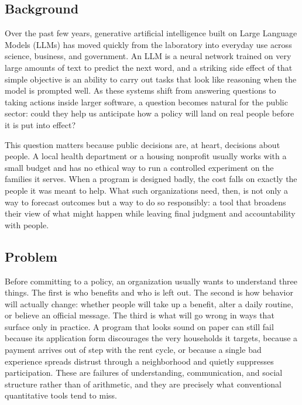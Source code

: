 \documentclass[conference]{IEEEtran}
\begin{document}
\subsection{Background}
Over the past few years, generative artificial intelligence built on Large Language Models (LLMs) has moved quickly from the laboratory into everyday use across science, business, and government. An LLM is a neural network trained on very large amounts of text to predict the next word, and a striking side effect of that simple objective is an ability to carry out tasks that look like reasoning when the model is prompted well. As these systems shift from answering questions to taking actions inside larger software, a question becomes natural for the public sector: could they help us anticipate how a policy will land on real people before it is put into effect?

This question matters because public decisions are, at heart, decisions about people. A local health department or a housing nonprofit usually works with a small budget and has no ethical way to run a controlled experiment on the families it serves. When a program is designed badly, the cost falls on exactly the people it was meant to help. What such organizations need, then, is not only a way to forecast outcomes but a way to do so responsibly: a tool that broadens their view of what might happen while leaving final judgment and accountability with people.

\subsection{Problem}
Before committing to a policy, an organization usually wants to understand three things. The first is who benefits and who is left out. The second is how behavior will actually change: whether people will take up a benefit, alter a daily routine, or believe an official message. The third is what will go wrong in ways that surface only in practice. A program that looks sound on paper can still fail because its application form discourages the very households it targets, because a payment arrives out of step with the rent cycle, or because a single bad experience spreads distrust through a neighborhood and quietly suppresses participation. These are failures of understanding, communication, and social structure rather than of arithmetic, and they are precisely what conventional quantitative tools tend to miss.
\end{document}
